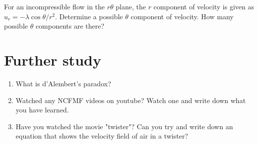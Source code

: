 
\begin{question}
For an incompressible flow in the $r\theta$ plane, the $r$ component of velocity is given as $u_r = -{\lambda \cos\theta/r^2}$. Determine a possible $\theta$ component of velocity. How many possible $\theta$ components are there?
\end{question}
\begin{solution}[print]
\end{solution}
  

\section{Further study}

\begin{enumerate}

\item What is d'Alembert's paradox?
 
\item Watched any NCFMF videos on youtube? Watch one and write down what you have learned. 

\item Have you watched the movie "twister"? Can you try and write down an equation that shows the velocity field of air in a twister?

\end{enumerate}

